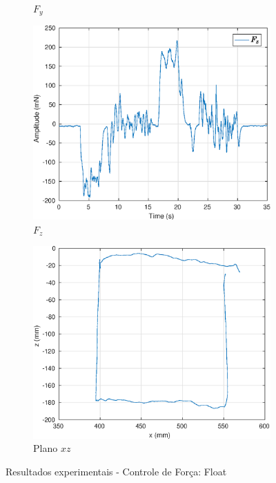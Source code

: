 \begin{figure}[H]
\begin{subfigure}{.5\textwidth}
  \caption{$F_y$}
  \label{fig:sub2}	
\end{subfigure}
\begin{subfigure}{.5\textwidth}
  \centering
  \includegraphics[width=\linewidth]{./img/float2/Fz.eps}
  \caption{$F_z$}
  \label{fig:sub1}
\end{subfigure}%
\begin{subfigure}{.5\textwidth}
  \centering
  \includegraphics[width=\linewidth]{./img/float2/xz.eps}
  \caption{Plano $xz$}
  \label{fig:sub2}
\end{subfigure}
\caption{Resultados experimentais - Controle de Força: Float}
\label{fig:test}
\end{figure}

